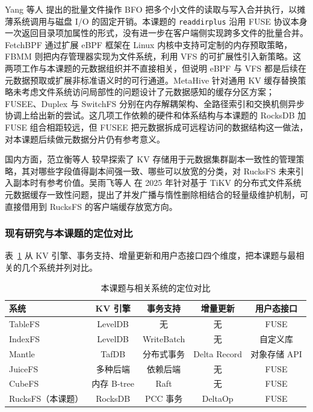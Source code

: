 Yang 等人\cite{yang2020batchfile} 提出的批量文件操作 BFO 把多个小文件的读取与写入合并执行，以摊薄系统调用与磁盘 I/O 的固定开销。本课题的 \texttt{readdirplus} 沿用 FUSE 协议本身一次返回目录项加属性的形式，没有进一步在客户端侧实现跨多文件的批量合并。FetchBPF\cite{mishler2024fetchbpf} 通过扩展 eBPF 框架在 Linux 内核中支持可定制的内存预取策略，FBMM\cite{tabatabai2024fbmm} 则把内存管理器实现为文件系统，利用 VFS 的可扩展性引入新策略。这两项工作与本课题的元数据组织并不直接相关，但说明 eBPF 与 VFS 都是后续在元数据预取或扩展非标准语义时的可行通道。MetaHive\cite{heidari2024metahive} 针对通用 KV 缓存替换策略未考虑文件系统访问局部性的问题设计了元数据感知的缓存分区方案；FUSEE\cite{shen2023fusee}、Duplex\cite{dong2023duplex} 与 SwitchFS\cite{xu2026switchfs} 分别在内存解耦架构、全路径索引和交换机侧异步协调上给出新的尝试。这几项工作依赖的硬件和体系结构与本课题的 RocksDB 加 FUSE 组合相距较远，但 FUSEE 把元数据拆成可远程访问的数据结构这一做法，对本课题后续做元数据分片仍有参考意义。

国内方面，范立衡等人\cite{fan2014kvmetadata} 较早探索了 KV 存储用于元数据集群副本一致性的管理策略，其对哪些字段值得副本间强一致、哪些可以放宽的分类，对 RucksFS 未来引入副本时有参考价值。吴雨飞等人\cite{wu2025dfscache} 在 2025 年针对基于 TiKV 的分布式文件系统元数据缓存一致性问题，提出了并发广播与惰性删除相结合的轻量级维护机制，可直接借用到 RucksFS 的客户端缓存放宽方向。

\subsubsection{现有研究与本课题的定位对比}

表~\ref{tab:system_compare} 从 KV 引擎、事务支持、增量更新和用户态接口四个维度，把本课题与最相关的几个系统并列对比。

\begin{table}[!ht]
    \centering
    \caption{本课题与相关系统的定位对比}
    \label{tab:system_compare}
    \small
    \begin{tabular}{lcccc}
    \toprule
        系统 & KV 引擎 & 事务支持 & 增量更新 & 用户态接口 \\ \midrule
        TableFS\cite{ren2013tablefs} & LevelDB & 无 & 无 & FUSE \\
        IndexFS\cite{ren2014indexfs} & LevelDB & WriteBatch & 无 & 自定义库 \\
        Mantle\cite{li2025mantle} & TafDB & 分布式事务 & Delta Record & 对象存储 API \\
        JuiceFS & 多种后端 & 依赖后端 & 无 & FUSE \\
        CubeFS\cite{liu2019cubefs} & 内存 B-tree & Raft & 无 & FUSE \\
        RucksFS（本课题） & RocksDB & PCC 事务 & DeltaOp & FUSE \\
    \bottomrule
    \end{tabular}
\end{table}

